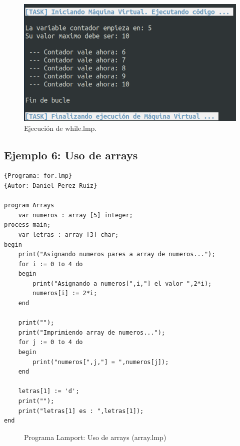 \newpage
\begin{figure}[h]
    \includegraphics[width=\linewidth]{images/ejemplos/while.png}
    \caption{Ejecución de while.lmp.}
    \label{fig:lamportWhile_exec}
\end{figure}

\newpage
\subsection{Ejemplo 6: Uso de arrays}
\begin{lstlisting}[style=lamportStyle]
{Programa: for.lmp}
{Autor: Daniel Perez Ruiz}

program Arrays
	var numeros : array [5] integer;
process main;
	var letras : array [3] char;
begin
	print("Asignando numeros pares a array de numeros...");
	for i := 0 to 4 do
	begin
		print("Asignando a numeros[",i,"] el valor ",2*i);
		numeros[i] := 2*i;
	end
	
	print("");
	print("Imprimiendo array de numeros...");
	for j := 0 to 4 do
	begin
		print("numeros[",j,"] = ",numeros[j]);
	end
	
	letras[1] := 'd';
	print("");
	print("letras[1] es : ",letras[1]);
end
\end{lstlisting}
\begin{figure}[h]
\caption{Programa Lamport: Uso de arrays (array.lmp)}
\label{fig:lamportArray}
\end{figure}

